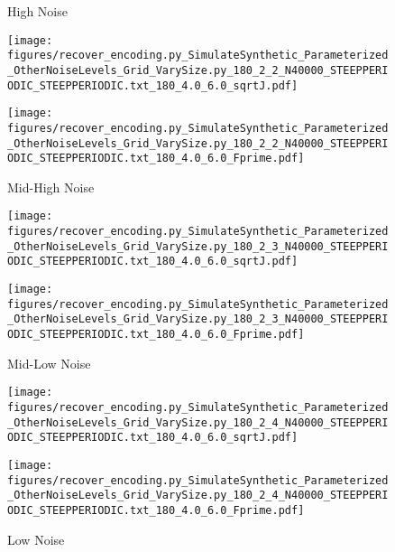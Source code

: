 \documentclass[si.tex]{subfiles}
\begin{document}
\begin{figure}[ht]
  \centering

High Noise

  \begin{minipage}[b]{0.45\textwidth}
    \centering
    \texttt{[image: figures/recover\_encoding.py\_SimulateSynthetic\_Parameterized\_OtherNoiseLevels\_Grid\_VarySize.py\_180\_2\_2\_N40000\_STEEPPERIODIC\_STEEPPERIODIC.txt\_180\_4.0\_6.0\_sqrtJ.pdf]}
  \end{minipage}
  \hfill
  \begin{minipage}[b]{0.45\textwidth}
    \centering
    \texttt{[image: figures/recover\_encoding.py\_SimulateSynthetic\_Parameterized\_OtherNoiseLevels\_Grid\_VarySize.py\_180\_2\_2\_N40000\_STEEPPERIODIC\_STEEPPERIODIC.txt\_180\_4.0\_6.0\_Fprime.pdf]}
  \end{minipage}

Mid-High Noise

  \begin{minipage}[b]{0.45\textwidth}
    \centering
    \texttt{[image: figures/recover\_encoding.py\_SimulateSynthetic\_Parameterized\_OtherNoiseLevels\_Grid\_VarySize.py\_180\_2\_3\_N40000\_STEEPPERIODIC\_STEEPPERIODIC.txt\_180\_4.0\_6.0\_sqrtJ.pdf]}
  \end{minipage}
  \hfill
  \begin{minipage}[b]{0.45\textwidth}
    \centering
    \texttt{[image: figures/recover\_encoding.py\_SimulateSynthetic\_Parameterized\_OtherNoiseLevels\_Grid\_VarySize.py\_180\_2\_3\_N40000\_STEEPPERIODIC\_STEEPPERIODIC.txt\_180\_4.0\_6.0\_Fprime.pdf]}
  \end{minipage}

Mid-Low Noise

  \begin{minipage}[b]{0.45\textwidth}
    \centering
    \texttt{[image: figures/recover\_encoding.py\_SimulateSynthetic\_Parameterized\_OtherNoiseLevels\_Grid\_VarySize.py\_180\_2\_4\_N40000\_STEEPPERIODIC\_STEEPPERIODIC.txt\_180\_4.0\_6.0\_sqrtJ.pdf]}
  \end{minipage}
  \hfill
  \begin{minipage}[b]{0.45\textwidth}
    \centering
    \texttt{[image: figures/recover\_encoding.py\_SimulateSynthetic\_Parameterized\_OtherNoiseLevels\_Grid\_VarySize.py\_180\_2\_4\_N40000\_STEEPPERIODIC\_STEEPPERIODIC.txt\_180\_4.0\_6.0\_Fprime.pdf]}
  \end{minipage}

Low Noise


\end{figure}
\end{document}
